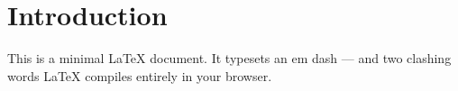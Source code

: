 \documentclass{article}
\begin{document}
\section{Introduction}
This is a minimal \LaTeX{} document. It typesets an em dash --- and
two clashing words
\noindent\hfill
\LaTeX{} compiles entirely in your browser.
\end{document}

